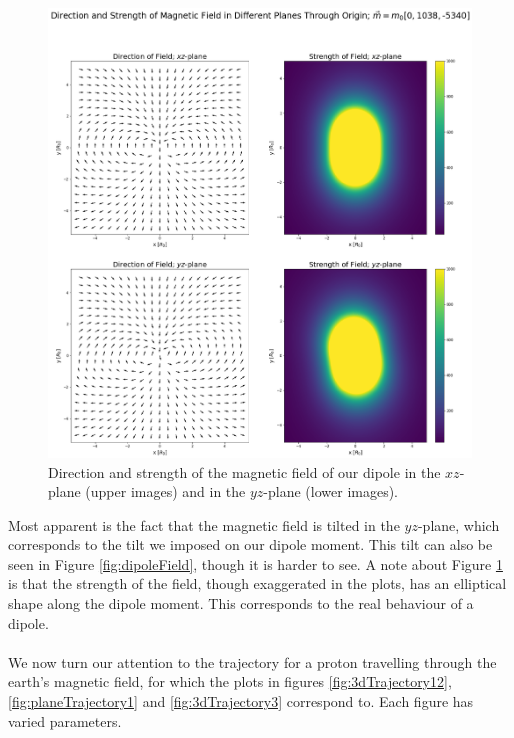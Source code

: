 \begin{figure}[H]
    \centering
    \includegraphics[scale=.28]{Images/dipolePlanes.png}
    \caption{Direction and strength of the magnetic field of our dipole in the $xz$-plane (upper images) and in the $yz$-plane (lower images).}
    \label{fig:dipolePlanes}
\end{figure}

\noindent Most apparent is the fact that the magnetic field is tilted in the $yz$-plane, which corresponds to the tilt we imposed on our dipole moment. This tilt can also be seen in Figure \ref{fig:dipoleField}, though it is harder to see. A note about Figure \ref{fig:dipolePlanes} is that the strength of the field, though exaggerated in the plots, has an elliptical shape along the dipole moment. This corresponds to the real behaviour of a dipole.\\
\\
We now turn our attention to the trajectory for a proton travelling through the earth's magnetic field, for which the plots in figures \ref{fig:3dTrajectory12}, \ref{fig:planeTrajectory1} and \ref{fig:3dTrajectory3} correspond to. Each figure has varied parameters.\\


